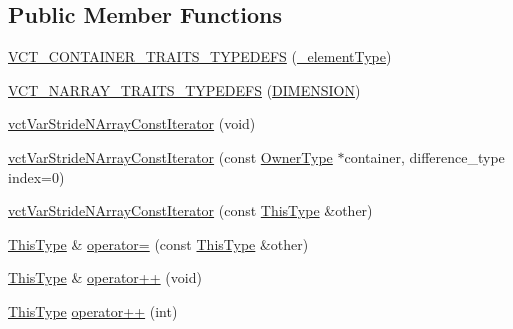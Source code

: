 \subsection*{Public Member Functions}
\begin{DoxyCompactItemize}
\item 
\hyperlink{classvct_var_stride_n_array_const_iterator_ae89910338c34d9b0cdc72fcc4ae12092}{V\-C\-T\-\_\-\-C\-O\-N\-T\-A\-I\-N\-E\-R\-\_\-\-T\-R\-A\-I\-T\-S\-\_\-\-T\-Y\-P\-E\-D\-E\-F\-S} (\hyperlink{classvct_var_stride_n_array_const_iterator_adb02654cc147e6ce3ceef03ebe78c4e2}{\-\_\-element\-Type})
\item 
\hyperlink{classvct_var_stride_n_array_const_iterator_a1d1db55ab0498294bba256e282a0ea8d}{V\-C\-T\-\_\-\-N\-A\-R\-R\-A\-Y\-\_\-\-T\-R\-A\-I\-T\-S\-\_\-\-T\-Y\-P\-E\-D\-E\-F\-S} (\hyperlink{classvct_var_stride_n_array_const_iterator_af8a3a7bff8c62645957f37e5f0a2cb26a66232514960f77bde765de7883b9c9ad}{D\-I\-M\-E\-N\-S\-I\-O\-N})
\item 
\hyperlink{classvct_var_stride_n_array_const_iterator_a802806a33cb622fd4bdd438175d95c90}{vct\-Var\-Stride\-N\-Array\-Const\-Iterator} (void)
\item 
\hyperlink{classvct_var_stride_n_array_const_iterator_ad0c5f8b7c4e1e88d9af26d5605c60376}{vct\-Var\-Stride\-N\-Array\-Const\-Iterator} (const \hyperlink{classvct_var_stride_n_array_const_iterator_ac75d53a8defeee467ba9ebe2962e29ac}{Owner\-Type} $\ast$container, difference\-\_\-type index=0)
\item 
\hyperlink{classvct_var_stride_n_array_const_iterator_a905d6e8a90b5c0bff01fc145b77a859b}{vct\-Var\-Stride\-N\-Array\-Const\-Iterator} (const \hyperlink{classvct_var_stride_n_array_const_iterator_ac729d2af265785aad6fdd43a70fbffdb}{This\-Type} \&other)
\item 
\hyperlink{classvct_var_stride_n_array_const_iterator_ac729d2af265785aad6fdd43a70fbffdb}{This\-Type} \& \hyperlink{classvct_var_stride_n_array_const_iterator_a15bacda9f4ba8d656728839c40c7d72c}{operator=} (const \hyperlink{classvct_var_stride_n_array_const_iterator_ac729d2af265785aad6fdd43a70fbffdb}{This\-Type} \&other)
\item 
\hyperlink{classvct_var_stride_n_array_const_iterator_ac729d2af265785aad6fdd43a70fbffdb}{This\-Type} \& \hyperlink{classvct_var_stride_n_array_const_iterator_af24b676b194e0cdd305b0e8f2469d8d8}{operator++} (void)
\item 
\hyperlink{classvct_var_stride_n_array_const_iterator_ac729d2af265785aad6fdd43a70fbffdb}{This\-Type} \hyperlink{classvct_var_stride_n_array_const_iterator_ad5f024132eccdaacd115fcff10e6d222}{operator++} (int)

\end{DoxyCompactItemize}
